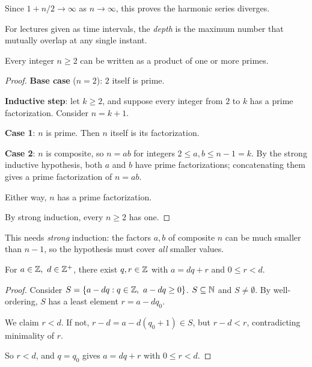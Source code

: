 \documentclass[11pt]{article}
\begin{document}
\begin{note}
Since $1+n/2 \to \infty$ as $n\to\infty$, this proves the harmonic series diverges.
\end{note}

\bigskip
\begin{definition}
For lectures given as time intervals, the \emph{depth} is the maximum number that mutually overlap at any single instant.
\end{definition}

\bigskip
\begin{theorem}
Every integer $n\ge2$ can be written as a product of one or more primes.
\end{theorem}
\begin{proof}
\textbf{Base case} ($n=2$): $2$ itself is prime.

\textbf{Inductive step}: let $k\ge2$, and suppose every integer from $2$ to $k$ has a prime factorization. Consider $n=k+1$.

\textbf{Case 1}: $n$ is prime. Then $n$ itself is its factorization.

\textbf{Case 2}: $n$ is composite, so $n=ab$ for integers $2\le a,b\le n-1=k$. By the strong inductive hypothesis, both $a$ and $b$ have prime factorizations; concatenating them gives a prime factorization of $n=ab$.

Either way, $n$ has a prime factorization.

By strong induction, every $n\ge2$ has one.
\end{proof}

\begin{note}
This needs \emph{strong} induction: the factors $a,b$ of composite $n$ can be much smaller than $n-1$, so the hypothesis must cover \emph{all} smaller values.
\end{note}

\bigskip
\begin{theorem}
For $a\in\mathbb{Z},\ d\in\mathbb{Z}^+$, there exist $q,r\in\mathbb{Z}$ with $a=dq+r$ and $0\le r<d$.
\end{theorem}
\begin{proof}
Consider $S = \{a-dq : q\in\mathbb{Z},\ a-dq\ge0\}$. $S\subseteq\mathbb{N}$ and $S\neq\emptyset$. By well-ordering, $S$ has a least element $r=a-dq_0$.

We claim $r<d$. If not, $r-d = a-d(q_0+1) \in S$, but $r-d<r$, contradicting minimality of $r$.

So $r<d$, and $q=q_0$ gives $a=dq+r$ with $0\le r<d$.
\end{proof}
\end{document}
